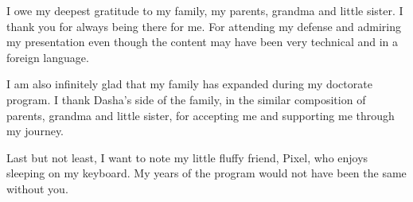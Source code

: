 	I owe my deepest gratitude to my family, my parents, grandma and little sister.
	I thank you for always being there for me.
	For attending my defense and admiring my presentation even though the content may have been very technical and in a foreign language.

	I am also infinitely glad that my family has expanded during my doctorate program.
	I thank Dasha's side of the family, in the similar composition of parents, grandma and little sister, for accepting me and supporting me through my journey.

	Last but not least, I want to note my little fluffy friend, Pixel, who enjoys sleeping on my keyboard.
	My years of the program would not have been the same without you.

